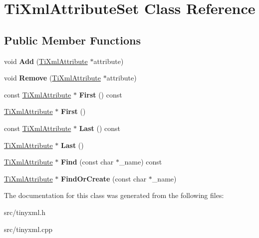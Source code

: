 \hypertarget{classTiXmlAttributeSet}{}\section{Ti\+Xml\+Attribute\+Set Class Reference}
\label{classTiXmlAttributeSet}
\subsection*{Public Member Functions}
\begin{DoxyCompactItemize}
\item 
void {\bfseries Add} (\hyperlink{classTiXmlAttribute}{Ti\+Xml\+Attribute} $\ast$attribute)\hypertarget{classTiXmlAttributeSet_a745e50ddaae3bee93e4589321e0b9c1a}{}\label{classTiXmlAttributeSet_a745e50ddaae3bee93e4589321e0b9c1a}

\item 
void {\bfseries Remove} (\hyperlink{classTiXmlAttribute}{Ti\+Xml\+Attribute} $\ast$attribute)\hypertarget{classTiXmlAttributeSet_a924a73d071f2573f9060f0be57879c57}{}\label{classTiXmlAttributeSet_a924a73d071f2573f9060f0be57879c57}

\item 
const \hyperlink{classTiXmlAttribute}{Ti\+Xml\+Attribute} $\ast$ {\bfseries First} () const \hypertarget{classTiXmlAttributeSet_ae0636e88cedd4b09d61c451860f68598}{}\label{classTiXmlAttributeSet_ae0636e88cedd4b09d61c451860f68598}

\item 
\hyperlink{classTiXmlAttribute}{Ti\+Xml\+Attribute} $\ast$ {\bfseries First} ()\hypertarget{classTiXmlAttributeSet_a99703bb08ca2aece2d7ef835de339ba0}{}\label{classTiXmlAttributeSet_a99703bb08ca2aece2d7ef835de339ba0}

\item 
const \hyperlink{classTiXmlAttribute}{Ti\+Xml\+Attribute} $\ast$ {\bfseries Last} () const \hypertarget{classTiXmlAttributeSet_a7b3f3ccf39a97bc25539d3fcc540296a}{}\label{classTiXmlAttributeSet_a7b3f3ccf39a97bc25539d3fcc540296a}

\item 
\hyperlink{classTiXmlAttribute}{Ti\+Xml\+Attribute} $\ast$ {\bfseries Last} ()\hypertarget{classTiXmlAttributeSet_ab4c4edfb2d74f6ea31aae096743bd6e0}{}\label{classTiXmlAttributeSet_ab4c4edfb2d74f6ea31aae096743bd6e0}

\item 
\hyperlink{classTiXmlAttribute}{Ti\+Xml\+Attribute} $\ast$ {\bfseries Find} (const char $\ast$\+\_\+name) const \hypertarget{classTiXmlAttributeSet_af3675cc2bfd0aea153cda1cfcdd1f77e}{}\label{classTiXmlAttributeSet_af3675cc2bfd0aea153cda1cfcdd1f77e}

\item 
\hyperlink{classTiXmlAttribute}{Ti\+Xml\+Attribute} $\ast$ {\bfseries Find\+Or\+Create} (const char $\ast$\+\_\+name)\hypertarget{classTiXmlAttributeSet_a5e28f5d32f048fba85d04dc317495bdc}{}\label{classTiXmlAttributeSet_a5e28f5d32f048fba85d04dc317495bdc}

\end{DoxyCompactItemize}


The documentation for this class was generated from the following files\+:\begin{DoxyCompactItemize}
\item 
src/tinyxml.\+h\item 
src/tinyxml.\+cpp\end{DoxyCompactItemize}
